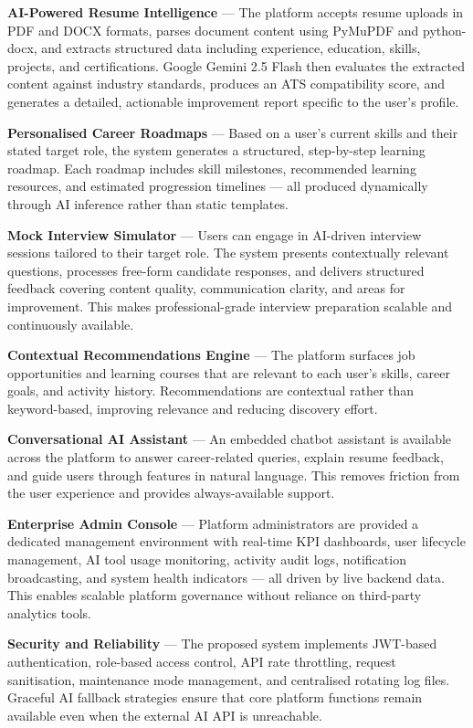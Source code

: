 \documentclass[12pt]{article}
\begin{document}
\textbf{AI-Powered Resume Intelligence} --- The platform accepts resume uploads in PDF and DOCX formats, parses document content using PyMuPDF and python-docx, and extracts structured data including experience, education, skills, projects, and certifications. Google Gemini 2.5 Flash then evaluates the extracted content against industry standards, produces an ATS compatibility score, and generates a detailed, actionable improvement report specific to the user's profile.

\textbf{Personalised Career Roadmaps} --- Based on a user's current skills and their stated target role, the system generates a structured, step-by-step learning roadmap. Each roadmap includes skill milestones, recommended learning resources, and estimated progression timelines --- all produced dynamically through AI inference rather than static templates.

\textbf{Mock Interview Simulator} --- Users can engage in AI-driven interview sessions tailored to their target role. The system presents contextually relevant questions, processes free-form candidate responses, and delivers structured feedback covering content quality, communication clarity, and areas for improvement. This makes professional-grade interview preparation scalable and continuously available.

\textbf{Contextual Recommendations Engine} --- The platform surfaces job opportunities and learning courses that are relevant to each user's skills, career goals, and activity history. Recommendations are contextual rather than keyword-based, improving relevance and reducing discovery effort.

\textbf{Conversational AI Assistant} --- An embedded chatbot assistant is available across the platform to answer career-related queries, explain resume feedback, and guide users through features in natural language. This removes friction from the user experience and provides always-available support.

\textbf{Enterprise Admin Console} --- Platform administrators are provided a dedicated management environment with real-time KPI dashboards, user lifecycle management, AI tool usage monitoring, activity audit logs, notification broadcasting, and system health indicators --- all driven by live backend data. This enables scalable platform governance without reliance on third-party analytics tools.

\textbf{Security and Reliability} --- The proposed system implements JWT-based authentication, role-based access control, API rate throttling, request sanitisation, maintenance mode management, and centralised rotating log files. Graceful AI fallback strategies ensure that core platform functions remain available even when the external AI API is unreachable.
\end{document}
